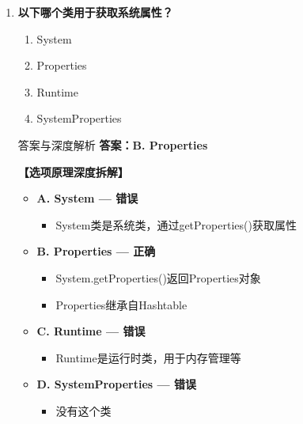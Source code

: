 \documentclass[12pt, a4paper]{ctexart}
\begin{document}
\begin{enumerate}[label=\textbf{\arabic*.}]
	      \vspace{1em}

	\item \textbf{以下哪个类用于获取系统属性？}
	      \begin{enumerate}[label=\Alph*.]
		      \item System
		      \item Properties
		      \item Runtime
		      \item SystemProperties
	      \end{enumerate}

	      \begin{bluebox}{答案与深度解析}
		      \textbf{答案：B. Properties}

		      \textbf{【选项原理深度拆解】}
					  \begin{itemize}[label={}, leftmargin=*, nosep]


		      \item \textbf{A. System — 错误}
					  \begin{itemize}[label={}, nosep]
		      
			      \item System类是系统类，通过getProperties()获取属性

					  \end{itemize}
		      \item \textbf{B. Properties — 正确}
					  \begin{itemize}[label={}, nosep]
		      
			      \item System.getProperties()返回Properties对象
			      \item Properties继承自Hashtable
		      

					  \end{itemize}
		      \item \textbf{C. Runtime — 错误}
					  \begin{itemize}[label={}, nosep]
		      
			      \item Runtime是运行时类，用于内存管理等
		      

					  \end{itemize}
		      \item \textbf{D. SystemProperties — 错误}
					  \begin{itemize}[label={}, nosep]
		      
			      \item 没有这个类
		      

\end{itemize}
\end{itemize}
\end{bluebox}
\end{enumerate}
\end{document}
